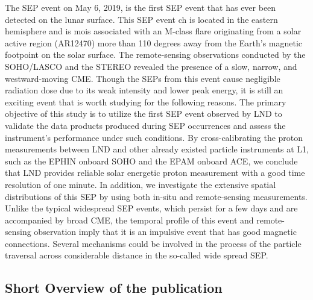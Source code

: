 The \ac{SEP} event on May 6, 2019, is the first \ac{SEP} event that has ever been detected on the lunar surface.
This \ac{SEP} event ch is located in the eastern hemisphere and is mois associated with an M-class flare originating from a solar active region (AR12470) more than 110 degrees away from the Earth's magnetic footpoint on the solar surface. The remote-sensing observations conducted by the \ac{SOHO}/\ac{LASCO} and the \ac{STEREO} revealed the presence of a slow, narrow, and westward-moving \ac{CME}. 
Though the \acp{SEP} from this event cause negligible radiation dose due to its weak intensity and lower peak energy, it is still an exciting event that is worth studying for the following reasons.
The primary objective of this study is to utilize the first \ac{SEP} event observed by \ac{LND} to validate the data products produced during \ac{SEP} occurrences and assess the instrument's performance under such conditions. By cross-calibrating the proton measurements between \ac{LND} and other already existed particle instruments at \ac{L1}, such as the \ac{EPHIN} onboard \ac{SOHO} and the \ac{EPAM} onboard \ac{ACE}, we conclude that \ac{LND} provides reliable solar energetic proton measurement with a good time resolution of one minute.
In addition, we investigate the extensive spatial distributions of this \ac{SEP} by using both in-situ and remote-sensing measurements. Unlike the typical widespread \ac{SEP} events, which persist for a few days and are accompanied by broad \ac{CME}, the temporal profile of this event and remote-sensing observation imply that it is an impulsive event that has good magnetic connections. Several mechanisms could be involved in the process of the particle traversal across considerable distance in the so-called wide spread \acs{SEP}. 

\subsection*{Short Overview of the publication}

